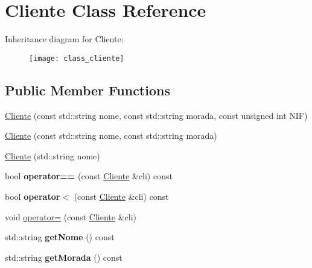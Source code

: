 \hypertarget{class_cliente}{}\section{Cliente Class Reference}
\label{class_cliente}
Inheritance diagram for Cliente\+:\begin{figure}[H]
\begin{center}
\leavevmode
\texttt{[image: class\_cliente]}
\end{center}
\end{figure}
\subsection*{Public Member Functions}
\begin{DoxyCompactItemize}
\item 
\hyperlink{class_cliente_a5957c05b3d3594a7cbd8c088486d14ae}{Cliente} (const std\+::string nome, const std\+::string morada, const unsigned int N\+IF)
\item 
\hyperlink{class_cliente_a030699a841488d4b3dfbedf75834e002}{Cliente} (const std\+::string nome, const std\+::string morada)
\item 
\hyperlink{class_cliente_a17e05e34ce319b738fb68c53e4ded2c3}{Cliente} (std\+::string nome)
\item 
\mbox{\label{class_cliente_a7972b72a8288e5dee92b30579017c549}} 
bool {\bfseries operator==} (const \hyperlink{class_cliente}{Cliente} \&cli) const
\item 
\mbox{\label{class_cliente_aa1c8490c22c31b6c7ccdb794cadc866d}} 
bool {\bfseries operator$<$} (const \hyperlink{class_cliente}{Cliente} \&cli) const
\item 
void \hyperlink{class_cliente_a3aa84b64135b106669724fc08b7cc91f}{operator=} (const \hyperlink{class_cliente}{Cliente} \&cli)
\item 
\mbox{\label{class_cliente_abfd45b8b07a8549fe4761d00c76a43c3}} 
std\+::string {\bfseries get\+Nome} () const
\item 
\mbox{\label{class_cliente_af73bfd0b9fc0f7facf4f6d9acbe757b1}} 
std\+::string {\bfseries get\+Morada} () const
\item 
\mbox{\label{class_cliente_a8dedf04f5520b5849ecd70a1c4d07a86}} 

\end{DoxyCompactItemize}
